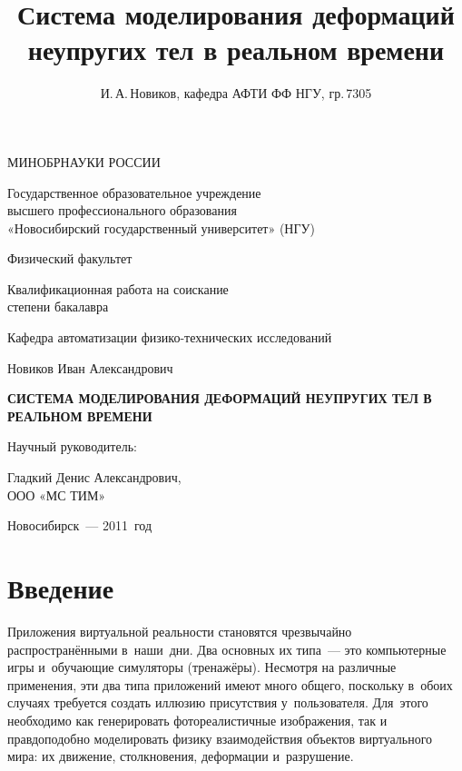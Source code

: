 \documentclass[a4paper, 14pt, titlepage]{extarticle}
\author{И.\,А.\,Новиков, кафедра АФТИ ФФ НГУ, гр.\,7305}
\title{Система моделирования деформаций неупругих тел в реальном времени}
\let\oldsection\section
\renewcommand{\section}{\newpage\oldsection}
\begin{document}

  \thispagestyle{empty}
  \begin {center}
  МИНОБРНАУКИ РОССИИ

  \vspace{0.3cm}

  Государственное образовательное учреждение\\
  высшего профессионального образования\\
  «Новосибирский государственный университет» (НГУ)

  \vspace{0.6cm}

  Физический факультет

  \vspace {2cm}

  Квалификационная работа на соискание\\
  степени бакалавра

  \vspace {0.5cm}

  Кафедра автоматизации физико-технических исследований

  \vspace {1cm}

  Новиков Иван Александрович

  \vspace {1.5cm}

  \textbf{СИСТЕМА МОДЕЛИРОВАНИЯ ДЕФОРМАЦИЙ НЕУПРУГИХ ТЕЛ В РЕАЛЬНОМ ВРЕМЕНИ}

  \vspace {1.5cm}

  \begin{flushright}

    Научный руководитель:

    Гладкий Денис Александрович,\\
    ООО «МС ТИМ»

  \end{flushright}

  \vspace {3cm}

  Новосибирск~--- 2011~год
  \end {center}


  \tableofcontents
  \newpage

  \section{Введение}

    Приложения виртуальной реальности становятся чрезвычайно рас\-прос\-тра\-нён\-ны\-ми в~наши~дни.  Два
    основных их типа~--- это компьютерные игры и~обучающие симуляторы (тренажёры). Несмотря на
    различные применения, эти два типа приложений имеют много общего, поскольку в~обоих случаях
    требуется создать иллюзию присутствия у~пользователя. Для~этого необходимо как генерировать
    фотореалистичные изображения, так и правдоподобно моделировать физику взаимодействия объектов
    виртуального мира: их движение, столкновения, деформации и~разрушение.
\end{document}
